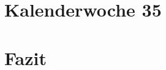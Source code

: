 \documentclass[11pt]{article} %
\begin{document}
\section{Kalenderwoche 35} \label{sec:kw3}
\section{Fazit} \label{sec:faz}

\newpage


\newpage

\end{document}

